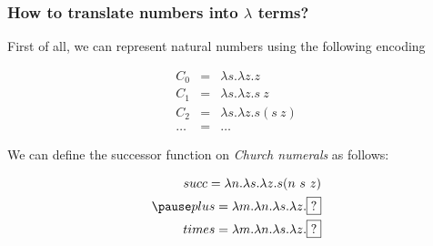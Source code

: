 \documentclass{beamer}
\begin{document}
\begin{frame}
 \frametitle{How to translate numbers into $\lambda$ terms?}

  First of all, we can represent natural numbers using the 
  following encoding   
  
  \begin{eqnarray*}
   C_0 & = & \lambda s . \lambda z . z \\ 
   C_1 & = & \lambda s . \lambda z . s\ z \\ 
   C_2 & = & \lambda s . \lambda z . s (s\ z) \\  
   \ldots & = & \ldots
  \end{eqnarray*}

  We can define the successor function on \emph{Church numerals} as follows: 
  
  \begin{eqnarray*} 
    succ = \lambda n . \lambda s . \lambda z . s (n\ s\ z) \\ \pause 
    plus = \lambda m . \lambda n . \lambda s . \lambda z . \framebox{?} \\
   times = \lambda m . \lambda n . \lambda s . \lambda z . \framebox{?} 
  \end{eqnarray*} 
\end{frame}
\end{document}
